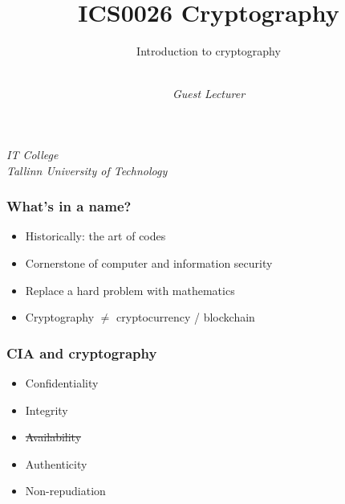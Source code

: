 
\usepackage{crysymb}

\usepackage{graphicx}

\usepackage{soul}

\usepackage{csquotes}

\usepackage{fontspec}
\usepackage{unicode-math}
\usepackage{microtype}

\title[Short version of title]{ICS0026 Cryptography}
\subtitle{Introduction to cryptography}
\author%
{%
    \\
    \textit{\footnotesize Guest Lecturer}
}
\institute%
{%
    \textit{IT College}\\
    \textit{Tallinn University of Technology}
}


\begin{frame}[plain]
  \titlepage
\end{frame}

\begin{frame}
  \frametitle{What's in a name?}

  \pause
  \begin{itemize}[<+->]
    \item Historically: the art of codes
    \item Cornerstone of computer and information security
    \item Replace a hard problem with mathematics
    \item Cryptography $\neq$ cryptocurrency / blockchain
  \end{itemize}
\end{frame}

\begin{frame}
  \frametitle{CIA and cryptography}

  \pause
  \begin{itemize}
    \item Confidentiality
    \item Integrity
    \item \st{Availability}
    \pause
    \item Authenticity
    \item Non-repudiation
  \end{itemize}
\end{frame}

